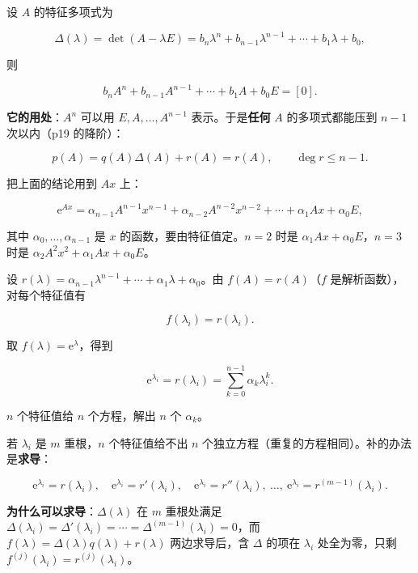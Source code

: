 \documentclass[11pt]{ctexart}
\begin{document}
设 $A$ 的特征多项式为

\[
\Delta(\lambda)=\det(A-\lambda E)=b_n\lambda^n+b_{n-1}\lambda^{n-1}+\cdots+b_1\lambda+b_0,
\]

则

\[
b_nA^n+b_{n-1}A^{n-1}+\cdots+b_1A+b_0E=[0].
\]

\textbf{它的用处}：$A^n$ 可以用 $E,A,\dots,A^{n-1}$ 表示。于是\textbf{任何} $A$ 的多项式都能压到 $n-1$ 次以内（p19 的降阶）：

\[
p(A)=q(A)\Delta(A)+r(A)=r(A),\qquad \deg r\le n-1 .
\]


把上面的结论用到 $Ax$ 上：

\[
\mathrm{e}^{Ax}=\alpha_{n-1}A^{n-1}x^{n-1}+\alpha_{n-2}A^{n-2}x^{n-2}+\cdots+\alpha_1Ax+\alpha_0E,
\]

其中 $\alpha_0,\dots,\alpha_{n-1}$ 是 $x$ 的函数，要由特征值定。$n=2$ 时是 $\alpha_1Ax+\alpha_0E$，$n=3$ 时是 $\alpha_2A^2x^2+\alpha_1Ax+\alpha_0E$。


设 $r(\lambda)=\alpha_{n-1}\lambda^{n-1}+\cdots+\alpha_1\lambda+\alpha_0$。由 $f(A)=r(A)$（$f$ 是解析函数），对每个特征值有

\[
f(\lambda_i)=r(\lambda_i).
\]

取 $f(\lambda)=\mathrm{e}^{\lambda}$，得到

\[
\mathrm{e}^{\lambda_i}=r(\lambda_i)=\sum_{k=0}^{n-1}\alpha_k\lambda_i^k .
\]

$n$ 个特征值给 $n$ 个方程，解出 $n$ 个 $\alpha_k$。



若 $\lambda_i$ 是 $m$ 重根，$n$ 个特征值给不出 $n$ 个独立方程（重复的方程相同）。补的办法是\textbf{求导}：

\[
\mathrm{e}^{\lambda_i}=r(\lambda_i),\quad
\mathrm{e}^{\lambda_i}=r'(\lambda_i),\quad
\mathrm{e}^{\lambda_i}=r''(\lambda_i),\ \dots,\
\mathrm{e}^{\lambda_i}=r^{(m-1)}(\lambda_i).
\]

\textbf{为什么可以求导}：$\Delta(\lambda)$ 在 $m$ 重根处满足 $\Delta(\lambda_i)=\Delta'(\lambda_i)=\cdots=\Delta^{(m-1)}(\lambda_i)=0$，而 $f(\lambda)=\Delta(\lambda)q(\lambda)+r(\lambda)$ 两边求导后，含 $\Delta$ 的项在 $\lambda_i$ 处全为零，只剩 $f^{(j)}(\lambda_i)=r^{(j)}(\lambda_i)$。
\end{document}
